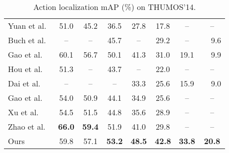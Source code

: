 \documentclass[10pt,twocolumn,letterpaper]{article}
\begin{document}
\begin{table}[t]
\begin{tabular}{lccccccc}
  Yuan et al.~\cite{yuan:cvpr2017}                    & 51.0          & 45.2          & 36.5          & 27.8          & 17.8          & --            & --            \\
  Buch et al.~\cite{buch:bmvc2017}                    & --            & --            & 45.7          & --            & 29.2          & --            & ~~9.6         \\
  Gao et al.~\cite{gao:bmvc2017}                      & 60.1          & 56.7          & 50.1          & 41.3          & 31.0          & 19.1          & ~~9.9         \\
  Hou et al.~\cite{hou:bmvc2017}                      & 51.3          & --            & 43.7          & --            & 22.0          & --            & --            \\
  Dai et al.~\cite{dai:iccv2017}                      & --            & --            & --            & 33.3          & 25.6          & 15.9          & ~~9.0         \\
  Gao et al.~\cite{gao:iccv2017}                      & 54.0          & 50.9          & 44.1          & 34.9          & 25.6          & --            & --            \\
  Xu et al.~\cite{xu:iccv2017}                        & 54.5          & 51.5          & 44.8          & 35.6          & 28.9          & --            & --            \\ \Bstrut
  Zhao et al.~\cite{zhao:iccv2017}                    & \textbf{66.0} & \textbf{59.4} & 51.9          & 41.0          & 29.8          & --            & --            \\ \hline
\TBstrut
  Ours                                                & 59.8          & 57.1          & \textbf{53.2} & \textbf{48.5} & \textbf{42.8} & \textbf{33.8} & \textbf{20.8} \\
\hline
 \end{tabular}
 \vspace{-2mm}
 \caption{\small Action localization mAP (\%) on THUMOS'14.}
\vspace{-2mm}
 \label{tab:benchmark-localize}
\end{table}
\end{document}
